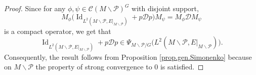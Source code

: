 \documentclass[10pt,a4paper]{amsart}
\newcommand{\maC}{\mathcal C}
\newcommand{\maD}{\mathcal D}
\newcommand{\maP}{\mathcal P}
\newcommand{\oid}{\operatorname{Id}}
\begin{document}
\begin{proof}
Since for any $\phi, \psi \in \maC(M\smallsetminus \maP)^G$ with disjoint support, 
\begin{equation*}
M_\phi\big(\oid_{L^2(M\smallsetminus \maP,E\vert_{M\smallsetminus \maP})} + p \maD p\big) M_\psi=M_\phi \maD M_\psi 
\end{equation*}
is a compact operator, we get that
\begin{equation*}
\oid_{L^2(M\smallsetminus \maP,E\vert_{M\smallsetminus \maP})} + p \maD p \in \Psi_{M\smallsetminus \maP/G}\big(L^2(M\smallsetminus \maP,E\vert_{M\smallsetminus \maP})\big).
\end{equation*}  
Consequently, the result follows from Proposition \ref{prop.gen.Simonenko}
because on $M\smallsetminus \maP$ the property of strong convergence to $0$ is satisfied. 
\end{proof}
\end{document}
